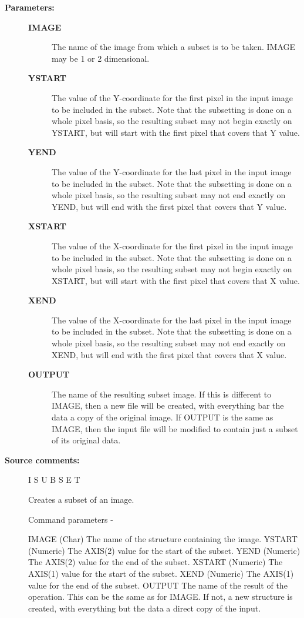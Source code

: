 \begin{description}
\begin{description}
\item [\textbf{Parameters:}]
\begin{description}
\item [\textbf{IMAGE}]
 The name of the image from which a subset
 is to be taken.  IMAGE may be 1 or 2 dimensional.
\item [\textbf{YSTART}]
 The value of the Y-coordinate for the first
 pixel in the input image to be included in the subset.
 Note that the subsetting is done on a whole pixel basis,
 so the resulting subset may not begin exactly on YSTART,
 but will start with the first pixel that covers that
 Y value.
\item [\textbf{YEND}]
 The value of the Y-coordinate for the last
 pixel in the input image to be included in the subset.
 Note that the subsetting is done on a whole pixel basis,
 so the resulting subset may not end exactly on YEND,
 but will end with the first pixel that covers that
 Y value.
\item [\textbf{XSTART}]
 The value of the X-coordinate for the first
 pixel in the input image to be included in the subset.
 Note that the subsetting is done on a whole pixel basis,
 so the resulting subset may not begin exactly on XSTART,
 but will start with the first pixel that covers that
 X value.
\item [\textbf{XEND}]
 The value of the X-coordinate for the last
 pixel in the input image to be included in the subset.
 Note that the subsetting is done on a whole pixel basis,
 so the resulting subset may not end exactly on XEND,
 but will end with the first pixel that covers that
 X value.
\item [\textbf{OUTPUT}]
 The name of the resulting subset image.  If
 this is different to IMAGE, then a new file will be
 created, with everything bar the data a copy of the
 original image.  If OUTPUT is the same as IMAGE, then
 the input file will be modified to contain just a subset
 of its original data.
\end{description}

\item [\textbf{Source comments:}]
\begin{terminalv}
 I S U B S E T

 Creates a subset of an image.

 Command parameters -

 IMAGE  (Char) The name of the structure containing the image.
 YSTART (Numeric) The AXIS(2) value for the start of the subset.
 YEND   (Numeric) The AXIS(2) value for the end of the subset.
 XSTART (Numeric) The AXIS(1) value for the start of the subset.
 XEND   (Numeric) The AXIS(1) value for the end of the subset.
 OUTPUT The name of the result of the operation.  This can
        be the same as for IMAGE.  If not, a new structure
        is created, with everything but the data a direct
        copy of the input.


\end{terminalv}
\end{description}
\end{description}
